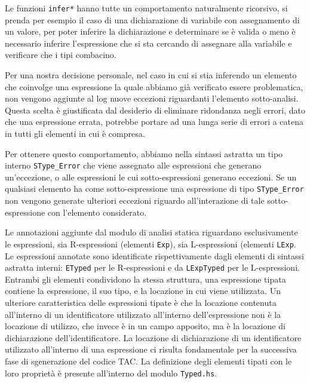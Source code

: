 Le funzioni \texttt{infer*} hanno tutte un comportamento naturalmente ricorsivo, si prenda per esempio il caso di una dichiarazione di variabile con assegnamento di un valore, per poter inferire la dichiarazione e determinare se è valida o meno è necessario inferire l'espressione che si sta cercando di assegnare alla variabile e verificare che i tipi combacino.

Per una nostra decisione personale, nel caso in cui si stia inferendo un elemento che coinvolge una espressione la quale abbiamo già verificato essere problematica, non vengono aggiunte al log nuove eccezioni riguardanti l'elemento sotto-analisi. Questa scelta è giustificata dal desiderio di eliminare ridondanza negli errori, dato che una espressione errata, potrebbe portare ad una lunga serie di errori a catena in tutti gli elementi in cui è compresa.

Per ottenere questo comportamento, abbiamo nella sintassi astratta un tipo interno \texttt{SType\_Error} che viene assegnato alle espressioni che generano un'eccezione, o alle espressioni le cui sotto-espressioni generano eccezioni. Se un qualsiasi elemento ha come sotto-espressione una espressione di tipo \texttt{SType\_Error} non vengono generate ulteriori eccezioni riguardo all'interazione di tale sotto-espressione con l'elemento considerato.

Le annotazioni aggiunte dal modulo di analisi statica riguardano esclusivamente le espressioni, sia R-espressioni (elementi \texttt{Exp}), sia L-espressioni (elementi \texttt{LExp}. Le espressioni annotate sono identificate rispettivamente dagli elementi di sintassi astratta interni: \texttt{ETyped} per le R-espressioni e da \texttt{LExpTyped} per le L-espressioni. Entrambi gli elementi condividono la stessa struttura, una espressione tipata contiene la espressione, il suo tipo, e la locazione in cui viene utilizzata. Un ulteriore caratteristica delle espressioni tipate è che la locazione contenuta all'interno di un identificatore utilizzato all'interno dell'espressione non è la locazione di utilizzo, che invece è in un campo apposito, ma è la locazione di dichiarazione dell'identificatore.
La locazione di dichiarazione di un identificatore utilizzato all'interno di una espressione ci risulta fondamentale per la successiva fase di sgenerazione del codice TAC.
La definizione degli elementi tipati con le loro proprietà è presente all'interno del modulo \texttt{Typed.hs}.



